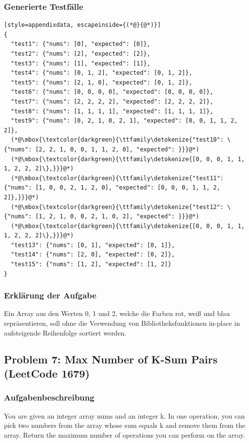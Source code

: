 \subsubsection*{Generierte Testfälle}
\begin{lstlisting}[style=appendixdata, escapeinside={(*@}{@*)}]
{
  "test1": {"nums": [0], "expected": [0]},
  "test2": {"nums": [2], "expected": [2]},
  "test3": {"nums": [1], "expected": [1]},
  "test4": {"nums": [0, 1, 2], "expected": [0, 1, 2]},
  "test5": {"nums": [2, 1, 0], "expected": [0, 1, 2]},
  "test6": {"nums": [0, 0, 0, 0], "expected": [0, 0, 0, 0]},
  "test7": {"nums": [2, 2, 2, 2], "expected": [2, 2, 2, 2]},
  "test8": {"nums": [1, 1, 1, 1], "expected": [1, 1, 1, 1]},
  "test9": {"nums": [0, 2, 1, 0, 2, 1], "expected": [0, 0, 1, 1, 2, 2]},
  (*@\mbox{\textcolor{darkgreen}{\ttfamily\detokenize{"test10": \{"nums": [2, 2, 1, 0, 0, 1, 1, 2, 0], "expected": }}}@*)
  (*@\mbox{\textcolor{darkgreen}{\ttfamily\detokenize{[0, 0, 0, 1, 1, 1, 2, 2, 2]\},}}}@*)
  (*@\mbox{\textcolor{darkgreen}{\ttfamily\detokenize{"test11": {"nums": [1, 0, 0, 2, 1, 2, 0], "expected": [0, 0, 0, 1, 1, 2, 2]},}}}@*)
  (*@\mbox{\textcolor{darkgreen}{\ttfamily\detokenize{"test12": \{"nums": [1, 2, 1, 0, 0, 2, 1, 0, 2], "expected": }}}@*)
  (*@\mbox{\textcolor{darkgreen}{\ttfamily\detokenize{[0, 0, 0, 1, 1, 1, 2, 2, 2]\},}}}@*)
  "test13": {"nums": [0, 1], "expected": [0, 1]},
  "test14": {"nums": [2, 0], "expected": [0, 2]},
  "test15": {"nums": [1, 2], "expected": [1, 2]}
}
\end{lstlisting}

\subsubsection*{Erklärung der Aufgabe}
Ein Array aus den Werten 0, 1 und 2, welche die Farben rot, weiß und blau repräsentieren, soll ohne die Verwendung von Bibliotheksfunktionen 
in-place in aufsteigende Reihenfolge sortiert werden.

\clearpage

\subsection{Problem 7: Max Number of K-Sum Pairs (LeetCode 1679)}

\subsubsection*{Aufgabenbeschreibung}
You are given an integer array nums and an integer k.
In one operation, you can pick two numbers from the array whose sum equals k and remove them from the array.
Return the maximum number of operations you can perform on the array.

